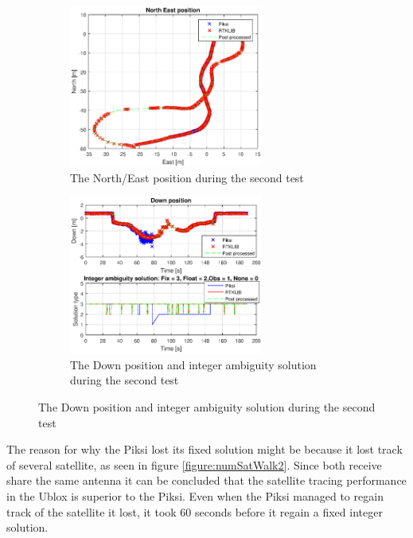 \begin{figure}[H]
\begin{subfigure}[H]{1\textwidth}
	\centering
		\includegraphics[width=0.7\textwidth]{figs/plots/xywalk2.eps}
		\caption{The North/East position during the second test}
		\label{figure:xyWalk2}
\end{subfigure}
\begin{subfigure}[H]{1\textwidth}
	\centering
		\includegraphics[width=0.7\textwidth]{figs/plots/downWalk2.eps}
		\caption{The Down position and integer ambiguity solution during the second test}
		\label{figure:downWalk2}
\end{subfigure}

\end{figure}
The reason for why the Piksi lost its fixed solution might be because it lost track of several satellite, as seen in figure \ref{figure:numSatWalk2}. Since both receive share the same antenna it can be concluded that the satellite tracing performance in the Ublox is superior to the Piksi.  Even when the Piksi managed to regain track of the satellite it lost, it took 60 seconds before it regain a fixed integer solution. 
